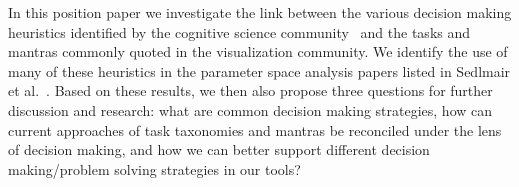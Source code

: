In this position paper we investigate the link between the various decision 
making heuristics identified by the cognitive science 
community~\citep{Payne:1993} and the tasks and mantras commonly quoted in
the visualization community. We identify the use of many of these heuristics
in the parameter space analysis papers listed in Sedlmair et 
al.~\citep{Sedlmair:2014}. Based on these results, we then also propose three 
questions for further discussion and research: what are common decision 
making strategies, how can current approaches of task taxonomies and mantras 
be reconciled under the lens of decision making, and how we can better 
support different decision making/problem solving strategies in our tools?

